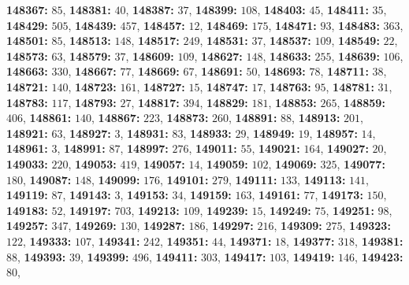 \textsf{\bfseries 148367:} $85$, \textsf{\bfseries 148381:} $40$, \textsf{\bfseries 148387:} $37$, \textsf{\bfseries 148399:} $108$, \textsf{\bfseries 148403:} $45$, \textsf{\bfseries 148411:} $35$, \textsf{\bfseries 148429:} $505$, \textsf{\bfseries 148439:} $457$, \textsf{\bfseries 148457:} $12$, \textsf{\bfseries 148469:} $175$, \textsf{\bfseries 148471:} $93$, \textsf{\bfseries 148483:} $363$, \textsf{\bfseries 148501:} $85$, \textsf{\bfseries 148513:} $148$, \textsf{\bfseries 148517:} $249$, \textsf{\bfseries 148531:} $37$, \textsf{\bfseries 148537:} $109$, \textsf{\bfseries 148549:} $22$, \textsf{\bfseries 148573:} $63$, \textsf{\bfseries 148579:} $37$, \textsf{\bfseries 148609:} $109$, \textsf{\bfseries 148627:} $148$, \textsf{\bfseries 148633:} $255$, \textsf{\bfseries 148639:} $106$, \textsf{\bfseries 148663:} $330$, \textsf{\bfseries 148667:} $77$, \textsf{\bfseries 148669:} $67$, \textsf{\bfseries 148691:} $50$, \textsf{\bfseries 148693:} $78$, \textsf{\bfseries 148711:} $38$, \textsf{\bfseries 148721:} $140$, \textsf{\bfseries 148723:} $161$, \textsf{\bfseries 148727:} $15$, \textsf{\bfseries 148747:} $17$, \textsf{\bfseries 148763:} $95$, \textsf{\bfseries 148781:} $31$, \textsf{\bfseries 148783:} $117$, \textsf{\bfseries 148793:} $27$, \textsf{\bfseries 148817:} $394$, \textsf{\bfseries 148829:} $181$, \textsf{\bfseries 148853:} $265$, \textsf{\bfseries 148859:} $406$, \textsf{\bfseries 148861:} $140$, \textsf{\bfseries 148867:} $223$, \textsf{\bfseries 148873:} $260$, \textsf{\bfseries 148891:} $88$, \textsf{\bfseries 148913:} $201$, \textsf{\bfseries 148921:} $63$, \textsf{\bfseries 148927:} $3$, \textsf{\bfseries 148931:} $83$, \textsf{\bfseries 148933:} $29$, \textsf{\bfseries 148949:} $19$, \textsf{\bfseries 148957:} $14$, \textsf{\bfseries 148961:} $3$, \textsf{\bfseries 148991:} $87$, \textsf{\bfseries 148997:} $276$, \textsf{\bfseries 149011:} $55$, \textsf{\bfseries 149021:} $164$, \textsf{\bfseries 149027:} $20$, \textsf{\bfseries 149033:} $220$, \textsf{\bfseries 149053:} $419$, \textsf{\bfseries 149057:} $14$, \textsf{\bfseries 149059:} $102$, \textsf{\bfseries 149069:} $325$, \textsf{\bfseries 149077:} $180$, \textsf{\bfseries 149087:} $148$, \textsf{\bfseries 149099:} $176$, \textsf{\bfseries 149101:} $279$, \textsf{\bfseries 149111:} $133$, \textsf{\bfseries 149113:} $141$, \textsf{\bfseries 149119:} $87$, \textsf{\bfseries 149143:} $3$, \textsf{\bfseries 149153:} $34$, \textsf{\bfseries 149159:} $163$, \textsf{\bfseries 149161:} $77$, \textsf{\bfseries 149173:} $150$, \textsf{\bfseries 149183:} $52$, \textsf{\bfseries 149197:} $703$, \textsf{\bfseries 149213:} $109$, \textsf{\bfseries 149239:} $15$, \textsf{\bfseries 149249:} $75$, \textsf{\bfseries 149251:} $98$, \textsf{\bfseries 149257:} $347$, \textsf{\bfseries 149269:} $130$, \textsf{\bfseries 149287:} $186$, \textsf{\bfseries 149297:} $216$, \textsf{\bfseries 149309:} $275$, \textsf{\bfseries 149323:} $122$, \textsf{\bfseries 149333:} $107$, \textsf{\bfseries 149341:} $242$, \textsf{\bfseries 149351:} $44$, \textsf{\bfseries 149371:} $18$, \textsf{\bfseries 149377:} $318$, \textsf{\bfseries 149381:} $88$, \textsf{\bfseries 149393:} $39$, \textsf{\bfseries 149399:} $496$, \textsf{\bfseries 149411:} $303$, \textsf{\bfseries 149417:} $103$, \textsf{\bfseries 149419:} $146$, \textsf{\bfseries 149423:} $80$, 
